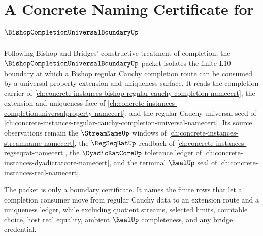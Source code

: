 \chapter{A Concrete Naming Certificate for $\BishopCompletionUniversalBoundaryUp$}
\label{ch:concrete-instances-bishop-completion-universal-boundary-namecert}

Following Bishop and Bridges' constructive treatment of completion, the $\BishopCompletionUniversalBoundaryUp$ packet isolates the finite L10 boundary at which a Bishop regular Cauchy completion route can be consumed by a universal-property extension and uniqueness surface. It reads the completion carrier of \autoref{ch:concrete-instances-bishop-regular-cauchy-completion-namecert}, the extension and uniqueness face of \autoref{ch:concrete-instances-completionuniversalproperty-namecert}, and the regular-Cauchy universal seed of \autoref{ch:concrete-instances-regular-cauchy-completion-universal-namecert}. Its source observations remain the $\StreamNameUp$ windows of \autoref{ch:concrete-instances-streamname-namecert}, the $\RegSeqRatUp$ readback of \autoref{ch:concrete-instances-regseqrat-namecert}, the $\DyadicRatCoreUp$ tolerance ledger of \autoref{ch:concrete-instances-dyadicratcore-namecert}, and the terminal $\RealUp$ seal of \autoref{ch:concrete-instances-real-namecert}.

The packet is only a boundary certificate. It names the finite rows that let a completion consumer move from regular Cauchy data to an extension route and a uniqueness ledger, while excluding quotient streams, selected limits, countable choice, host real equality, ambient $\RealUp$ completeness, and any bridge credential.

